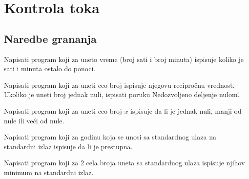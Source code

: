 \chapter{Kontrola toka}


\section{Naredbe grananja}

\begin{Exercise}[label=v1.2_01] 
Napisati program koji za uneto vreme (broj sati i broj minuta) ispisuje koliko je sati i minuta ostalo
   do ponoci.
\end{Exercise}
\begin{Answer}[ref=v1.2_01]
\end{Answer}

\begin{Exercise}[label=v1.2_02] 
Napisati program koji za uneti ceo broj ispisuje njegovu recipročnu vrednost.
Ukoliko je uneti broj jednak nuli, ispisati poruku \"Nedozvoljeno deljenje nulom\".
\end{Exercise}
\begin{Answer}[ref=v1.2_02]
\end{Answer}

\begin{Exercise}[label=v1.2_03] 
Napisati program koji za uneti ceo broj $x$ ispisuje da li je jednak nuli,
manji od nule ili veći od nule.
\end{Exercise}
\begin{Answer}[ref=v1.2_03]
\end{Answer}

\begin{Exercise}[label=v1.2_04] 
 Napisati program koji za godinu koja se unosi sa standardnog ulaza na standardni izlaz
  ispisuje da li je prestupna.
\end{Exercise}
\begin{Answer}[ref=v1.2_04]
\end{Answer}

\begin{Exercise}[label=v1.2_05] 
Napisati program koji za 2 cela broja uneta sa standardnog ulaza 
  ispisuje njihov minimum na standardni izlaz. 
\end{Exercise}
\begin{Answer}[ref=v1.2_05]
\end{Answer}


